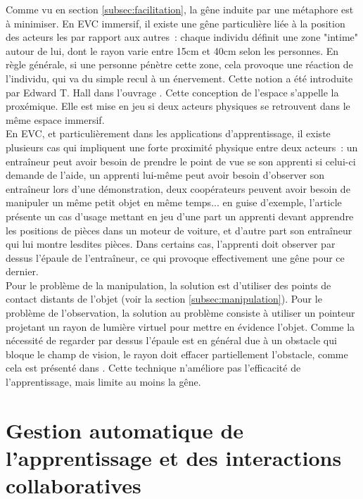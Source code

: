 \documentclass[11pt]{article}
\begin{document}
Comme vu en section \ref{subsec:facilitation}, la gêne induite par une métaphore est à minimiser. En EVC immersif, il existe une gêne particulière liée à la position des acteurs les par rapport aux autres~: chaque individu définit une zone "intime" autour de lui, dont le rayon varie entre 15cm et 40cm selon les personnes. En règle générale, si une personne pénètre cette zone, cela provoque une réaction de l'individu, qui va du simple recul à un énervement. Cette notion a été introduite par Edward T. Hall dans l'ouvrage \cite{proxemics}. Cette conception de l'espace s'appelle la proxémique. Elle est mise en jeu si deux acteurs physiques se retrouvent dans le même espace immersif.
\\

En EVC, et particulièrement dans les applications d'apprentissage, il existe plusieurs cas qui impliquent une forte proximité physique entre deux acteurs~: un entraîneur peut avoir besoin de prendre le point de vue se son apprenti si celui-ci demande de l'aide, un apprenti lui-même peut avoir besoin d'observer son entraîneur lors d'une démonstration, deux coopérateurs peuvent avoir besoin de manipuler un même petit objet en même temps... en guise d'exemple, l'article \cite{show-through} présente un cas d'usage mettant en jeu d'une part un apprenti devant apprendre les positions de pièces dans un moteur de voiture, et d'autre part son entraîneur qui lui montre lesdites pièces. Dans certains cas, l'apprenti doit observer par dessus l'épaule de l'entraîneur, ce qui provoque effectivement une gêne pour ce dernier.
\\

Pour le problème de la manipulation, la solution est d'utiliser des points de contact distants de l'objet (voir la section \ref{subsec:manipulation}). Pour le problème de l'observation, la solution au problème consiste à utiliser un pointeur projetant un rayon de lumière virtuel pour mettre en évidence l'objet. Comme la nécessité de regarder par dessus l'épaule est en général due à un obstacle qui bloque le champ de vision, le rayon doit effacer partiellement l'obstacle, comme cela est présenté dans \cite{show-through}. Cette technique n'améliore pas l'efficacité de l'apprentissage, mais limite au moins la gêne.

\section{Gestion automatique de l'apprentissage et des interactions collaboratives}
\end{document}
